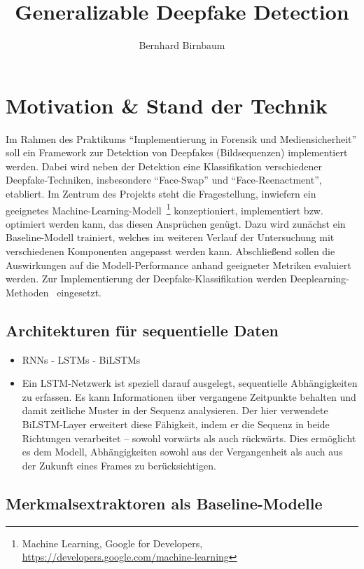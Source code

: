 \documentclass{article}
\title{Generalizable Deepfake Detection}
\author{Bernhard Birnbaum}
\begin{document}
    \maketitle

    \section{Motivation \& Stand der Technik}
    Im Rahmen des Praktikums \enquote{Implementierung in Forensik und Mediensicherheit} soll ein Framework zur Detektion von Deepfakes (Bildsequenzen) implementiert werden.
    Dabei wird neben der Detektion eine Klassifikation verschiedener Deepfake-Techniken, insbesondere \enquote{Face-Swap} und \enquote{Face-Reenactment}, etabliert.
    Im Zentrum des Projekts steht die Fragestellung, inwiefern ein geeignetes Machine-Learning-Modell~\footnote{Machine Learning, Google for Developers, \url{https://developers.google.com/machine-learning}} konzeptioniert, implementiert bzw. optimiert werden kann, das diesen Ansprüchen genügt.
    Dazu wird zunächst ein Baseline-Modell trainiert, welches im weiteren Verlauf der Untersuchung mit verschiedenen Komponenten angepasst werden kann.
    Abschließend sollen die Auswirkungen auf die Modell-Performance anhand geeigneter Metriken evaluiert werden.
    Zur Implementierung der Deepfake-Klassifikation werden Deeplearning-Methoden~\cite{deeplearningbook} eingesetzt.
    \subsection{Architekturen für sequentielle Daten}
    \begin{itemize}
        \item RNNs - LSTMs - BiLSTMs %
        \item Ein LSTM-Netzwerk ist speziell darauf ausgelegt, sequentielle Abhängigkeiten zu erfassen. Es kann Informationen über vergangene Zeitpunkte behalten und damit zeitliche Muster in der Sequenz analysieren. Der hier verwendete BiLSTM-Layer erweitert diese Fähigkeit, indem er die Sequenz in beide Richtungen verarbeitet – sowohl vorwärts als auch rückwärts. Dies ermöglicht es dem Modell, Abhängigkeiten sowohl aus der Vergangenheit als auch aus der Zukunft eines Frames zu berücksichtigen.
    \end{itemize}
    \subsection{Merkmalsextraktoren als Baseline-Modelle}
\end{document}
